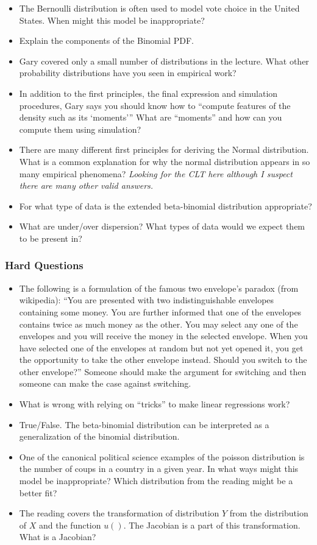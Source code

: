 \documentclass[11pt]{article}
\begin{document}
\begin{itemize}
\item The Bernoulli distribution is often used to model vote choice in the United States. When might this model be inappropriate?
\item Explain the components of the Binomial PDF.
\item Gary covered only a small number of distributions in the lecture.  What other probability distributions have you seen in empirical work?
\item In addition to the first principles, the final expression and simulation procedures, Gary says you should know how to ``compute features of the density such as its `moments'''  What are ``moments'' and how can you compute them using simulation?
\item There are many different first principles for deriving the Normal distribution.  What is a common explanation for why the normal distribution appears in so many empirical phenomena? \textit{Looking for the CLT here although I suspect there are many other valid answers.}   
\item For what type of data is the extended beta-binomial distribution appropriate?
\item What are under/over dispersion?  What types of data would we expect them to be present in?
\end{itemize}

\subsubsection{Hard Questions}

\begin{itemize}
\item The following is a formulation of the famous two envelope's paradox (from wikipedia):  ``You are presented with two indistinguishable envelopes containing some money. You are further informed that one of the envelopes contains twice as much money as the other. You may select any one of the envelopes and you will receive the money in the selected envelope. When you have selected one of the envelopes at random but not yet opened it, you get the opportunity to take the other envelope instead. Should you switch to the other envelope?''  Someone should make the argument for switching and then someone can make the case against switching.
\item What is wrong with relying on ``tricks'' to make linear regressions work?  
\item True/False. The beta-binomial distribution can be interpreted as a generalization of the binomial distribution.
\item One of the canonical political science examples of the poisson distribution is the number of coups in a country in a given year.  In what ways might this model be inappropriate?  Which distribution from the reading might be a better fit?
\item The reading covers the transformation of distribution $Y$ from the distribution of $X$ and the function $u()$.  The Jacobian is a part of this transformation.  What is a Jacobian?
\end{itemize}
\end{document}
